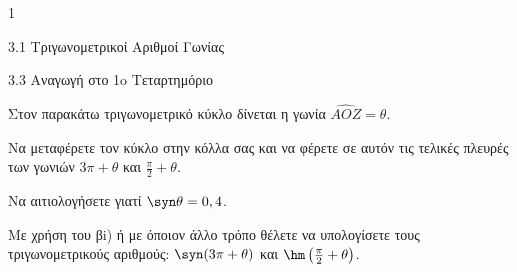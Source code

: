 \begin{ylh}{1}
\item 3.1 Τριγωνομετρικοί Αριθμοί Γωνίας
\item 3.3 Αναγωγή στο 1o Τεταρτημόριο
\end{ylh}
Στον παρακάτω τριγωνομετρικό κύκλο δίνεται η γωνία $\widehat{AOZ} = \theta$.
\begin{center}
\end{center}
\begin{alist}
\item Να μεταφέρετε τον κύκλο στην κόλλα σας και να φέρετε σε αυτόν τις τελικές πλευρές των γωνιών $3\pi + \theta$ και $\frac{\pi}{2} + \theta$.
\item
\begin{rlist}
\item Να αιτιολογήσετε γιατί $\syn \theta = 0,4$.
\item Με χρήση του βi) ή με όποιον άλλο τρόπο θέλετε να υπολογίσετε τους τριγωνομετρικούς αριθμούς: $\syn (3\pi + \theta)$ και $\hm \left(\frac{\pi}{2} + \theta\right)$.
\end{rlist}
\end{alist}


